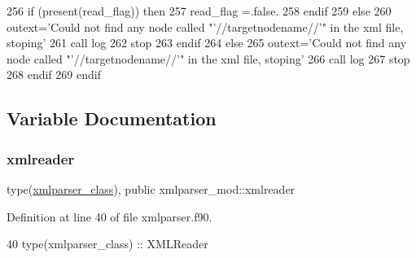 \begin{DoxyCode}
256                 \textcolor{keywordflow}{if} (\textcolor{keyword}{present}(read\_flag)) \textcolor{keywordflow}{then}
257                     read\_flag =.false.
258 \textcolor{keywordflow}{                endif}
259             \textcolor{keywordflow}{else}
260                 outext=\textcolor{stringliteral}{'Could not find any node called "'}//targetnodename//\textcolor{stringliteral}{'" in the xml file, stoping'}
261                 \textcolor{keyword}{call }log%
262                 stop
263 \textcolor{keywordflow}{            endif}
264         \textcolor{keywordflow}{else}
265             outext=\textcolor{stringliteral}{'Could not find any node called "'}//targetnodename//\textcolor{stringliteral}{'" in the xml file, stoping'}
266             \textcolor{keyword}{call }log%
267             stop
268 \textcolor{keywordflow}{        endif}
269 \textcolor{keywordflow}{    endif}
\end{DoxyCode}


\subsection{Variable Documentation}
\mbox{\label{namespacexmlparser__mod_a482bd93d0a4ba8c9c2000713a4b14799}} 
\subsubsection{\texorpdfstring{xmlreader}{xmlreader}}
{\footnotesize\ttfamily type(\mbox{\hyperlink{structxmlparser__mod_1_1xmlparser__class}{xmlparser\+\_\+class}}), public xmlparser\+\_\+mod\+::xmlreader}



Definition at line 40 of file xmlparser.\+f90.


\begin{DoxyCode}
40     \textcolor{keywordtype}{type}(xmlparser\_class) :: XMLReader
\end{DoxyCode}
